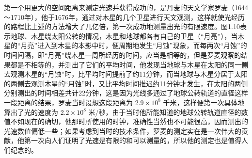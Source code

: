 第一个用更大的空间距离来测定光速并获得成功的，是丹麦的天文学家罗麦（1644～1710年），他于1676年，通过对木星的几个卫星进行天文观测，这样就使光经历的路程比上述的方法增大了几亿倍，第一次成功地测量出光的有限速度。图1.10表示地球、木星绕太阳公转的情况，木星和地球都各有自己的卫星（``月亮''），当木星的``月亮''进入到木星的本影中时，便周期地发生``月蚀''现象，而每两次``月蚀''的时间间隔，即``月亮''绕木星一周所经历的时间，应当是相等的，但是罗麦观察的结果都是不相等的，并测出了它们的平均时间，他发现当地球与木星在太阳的同一侧去观测木星的``月蚀''时，比平均时间提前了约11分钟，而当地球与木星分居于太阳的两侧去观测木星的``月蚀''时，又比平均时间推迟约11分钟才发生，在太阳的两侧分别测出的时间相差共计22分钟，这是因为光线多通过了地球公转轨道的直径这样一段距离的结果，罗麦当时设想这段距离为
\(2.9\times10^{8}\) 千米，这样便第一次具体地算出了光的速度为
\(2.2\times10^{8}\)
米/秒，由于当时他所能知道的地球公转轨道直径的数值不如现在的确切，他那时所使用的时钟，准确性当然也不可能很高，因而测出的光速数值偏低一些；如果考虑到当时的技术条件，罗麦的测定实在是一次伟大的贡献，他第一次向人们证明了光速是有限的和可以测量的，所以他的测定也是值得人们纪念的。

